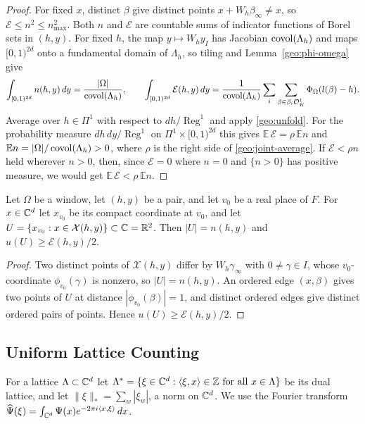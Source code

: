 \begin{proof}
For fixed $x$, distinct $\beta$ give distinct points
$x+W_h\beta_\infty\ne x$, so $\mathcal E\le n^2\le n_{\max}^2$. Both $n$
and $\mathcal E$ are countable sums of indicator functions of Borel sets
in $(h,y)$. For fixed $h$, the map $y\mapsto W_hy_I$ has Jacobian
$\operatorname{covol}(\Lambda_h)$ and maps $[0,1)^{2d}$ onto a fundamental domain of
$\Lambda_h$, so tiling and Lemma~\ref{geo:phi-omega} give
\[
 \int_{[0,1)^{2d}}n(h,y)\,dy=\frac{|\Omega|}{\operatorname{covol}(\Lambda_h)},\qquad
 \int_{[0,1)^{2d}}\mathcal E(h,y)\,dy
 =\frac1{\operatorname{covol}(\Lambda_h)}\sum_{i}\sum_{\beta\in\beta_i\mathcal O_K^1}
 \Phi_\Omega(l(\beta)-h).
\]
Average over $h\in\Pi^1$ with respect to $dh/\operatorname{Reg}^1$ and
apply \eqref{geo:unfold}. For the probability measure
$dh\,dy/\operatorname{Reg}^1$ on $\Pi^1\times[0,1)^{2d}$ this gives
$\mathbb E\,\mathcal E=\rho\,\mathbb En$ and
$\mathbb En=|\Omega|/\operatorname{covol}(\Lambda_h)>0$, where $\rho$ is the right
side of \eqref{geo:joint-average}. If $\mathcal E<\rho n$ held wherever
$n>0$, then, since $\mathcal E=0$ where $n=0$ and $\{n>0\}$ has positive
measure, we would get $\mathbb E\,\mathcal E<\rho\,\mathbb En$.
\end{proof}

\begin{lemma}\label{geo:planar}
Let $\Omega$ be a window, let $(h,y)$ be a pair, and let $v_0$ be a real
place of $F$. For $x\in\mathbb C^d$ let $x_{v_0}$ be its compact coordinate at
$v_0$, and let $U=\{x_{v_0}:x\in\mathcal X(h,y)\}\subset\mathbb C=\mathbb R^2$. Then
$|U|=n(h,y)$ and $u(U)\ge\mathcal E(h,y)/2$.
\end{lemma}

\begin{proof}
Two distinct points of $\mathcal X(h,y)$ differ by $W_h\gamma_\infty$
with $0\ne\gamma\in I$, whose $v_0$-coordinate $\phi_{v_0}(\gamma)$ is
nonzero, so $|U|=n(h,y)$. An ordered edge $(x,\beta)$ gives two points of
$U$ at distance $|\phi_{v_0}(\beta)|=1$, and distinct ordered edges give
distinct ordered pairs of points. Hence $u(U)\ge\mathcal E(h,y)/2$.
\end{proof}

\subsection{Uniform Lattice Counting}
For a lattice $\Lambda\subset\mathbb C^d$ let
$\Lambda^*=\{\xi\in\mathbb C^d:\langle\xi,x\rangle\in\mathbb Z\text{ for all
}x\in\Lambda\}$ be its dual lattice, and let
$\|\xi\|_*=\sum_w|\xi_w|$, a norm on $\mathbb C^d$. We use the Fourier
transform $\widehat\Psi(\xi)=\int_{\mathbb C^d}\Psi(x)e^{-2\pi i\langle
x,\xi\rangle}\,dx$.

